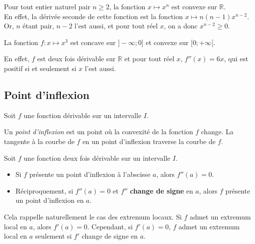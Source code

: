 \documentclass[11pt,fleqn, openany]{book} %
\begin{document}
\begin{example} Pour tout entier naturel pair $n\geqslant 2$, la fonction $x \mapsto x^n$ est convexe sur $\mathbb{R}$. \\ En effet, la dérivée seconde de cette fonction est la fonction $x\mapsto n(n-1)x^{n-2}$. \\Or, $n$ étant pair, $n-2$ l'est aussi, et pour tout réel $x$, on a donc $x^{n-2}\geqslant 0$.\end{example}

\begin{example}La fonction $f:x\mapsto x^3$ est concave sur $]-\infty ; 0]$ et convexe sur $[0;+\infty[$.

En effet, $f$ est deux fois dérivable sur $\mathbb{R}$ et pour tout réel $x$, $f''(x)=6x$, qui est positif si et seulement si $x$ l'est aussi.\end{example}

\subsection{Point d'inflexion}

\begin{definition}Soit $f$ une fonction dérivable sur un intervalle $I$.

Un \textit{point d'inflexion} est un point où la convexité de la fonction $f$ change. La tangente à la courbe de $f$ en un point d'inflexion traverse la courbe de $f$.\end{definition}

\begin{proposition}Soit $f$ une fonction deux fois dérivable sur un intervalle $I$. 
\begin{itemize}
\item Si $f$ présente un point d'inflexion à l'abscisse $a$, alors $f''(a)=0$.
\item Réciproquement, si $f''(a)=0$ et $f''$ \textbf{change de signe} en $a$, alors $f$ présente un point d'inflexion en $a$.
\end{itemize}\end{proposition}

Cela rappelle naturellement le cas des extremum locaux. Si $f$ admet un extremum local en $a$, alors $f'(a)=0$. Cependant, si $f'(a)=0$, $f$ admet un extremum local en $a$ seulement si $f'$ change de signe en $a$.
\end{document}
